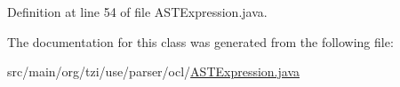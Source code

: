 Definition at line 54 of file A\-S\-T\-Expression.\-java.



The documentation for this class was generated from the following file\-:\begin{DoxyCompactItemize}
\item 
src/main/org/tzi/use/parser/ocl/\hyperlink{_a_s_t_expression_8java}{A\-S\-T\-Expression.\-java}\end{DoxyCompactItemize}
